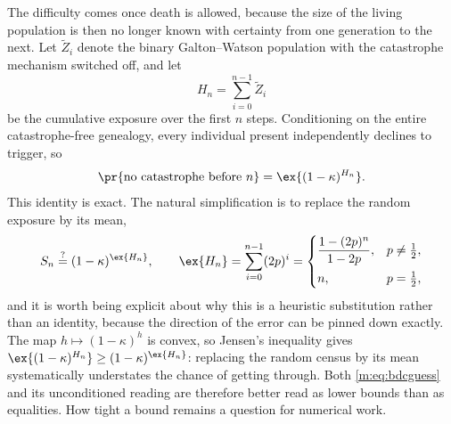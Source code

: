 The difficulty comes once death is allowed, because the size of the living
population is then no longer known with certainty from one generation to the next.
Let $\widetilde Z_i$ denote the binary Galton--Watson population with the
catastrophe mechanism switched off, and let
\begin{equation}
\label{m:eq:exposure}
H_n = \sum_{i=0}^{n-1}\widetilde Z_i
\end{equation}
be the cumulative exposure over the first $n$ steps. Conditioning on the entire
catastrophe-free genealogy, every individual present independently declines to
trigger, so
\begin{equation}
\label{m:eq:norupture}
\pr{\text{no catastrophe before }n} = \ex{(1-\kappa)^{H_n}} .
\end{equation}
This identity is exact. The natural simplification is to replace the random
exposure by its mean,
\begin{equation}
\label{m:eq:bdcguess}
S_n \overset{?}{=} (1-\kappa)^{\ex{H_n}},
\qquad
\ex{H_n} = \sum_{i=0}^{n-1}(2p)^i
= \begin{cases}\dfrac{1-(2p)^n}{1-2p}, & p\neq\tfrac12,\\[8pt] n, & p=\tfrac12,\end{cases}
\end{equation}
and it is worth being explicit about why this is a heuristic substitution rather
than an identity, because the direction of the error can be pinned down exactly.
The map $h\mapsto(1-\kappa)^h$ is convex, so Jensen's inequality gives
$\ex{(1-\kappa)^{H_n}}\ge(1-\kappa)^{\ex{H_n}}$: replacing the random census by its
mean systematically understates the chance of getting through. Both
\cref{m:eq:bdcguess} and its unconditioned reading are therefore better read as
lower bounds than as equalities. How tight a bound remains a question for numerical
work.


